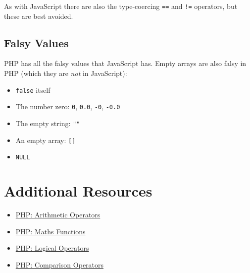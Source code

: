 As with JavaScript there are also the type-coercing \texttt{==} and \texttt{!=} operators, but these are best avoided.


\subsection{Falsy Values}

PHP has all the falsy values that JavaScript has. Empty arrays are also falsy in PHP (which they are \textit{not} in JavaScript):

\begin{itemize}
    \item \texttt{false} itself
    \item The number zero: \texttt{0}, \texttt{0.0}, \texttt{-0}, \texttt{-0.0}
    \item The empty string: \texttt{""}
    \item An empty array: \texttt{[]}
    \item \texttt{NULL}
\end{itemize}



\section{Additional Resources}

\begin{itemize}[leftmargin=*]
    \item \href{https://www.php.net/manual/en/language.operators.arithmetic.php}{PHP: Arithmetic Operators}
    \item \href{https://www.php.net/manual/en/ref.math.php}{PHP: Maths Functions}
    \item \href{http://php.net/manual/en/language.operators.logical.php}{PHP: Logical Operators}
    \item \href{http://php.net/manual/en/language.operators.comparison.php}{PHP: Comparison Operators}
\end{itemize}

